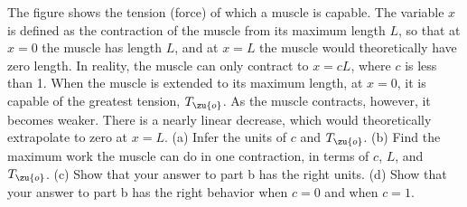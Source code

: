 The figure shows the tension (force) of which a muscle is capable.
The variable $x$ is defined as the contraction of the muscle from its maximum length $L$, so that at
$x=0$ the muscle has length $L$, and at $x=L$ the muscle would theoretically have zero length.
In reality, the muscle can only contract to $x=cL$, where $c$ is less than 1.
When the muscle is extended to its maximum length, at $x=0$, it is capable of the greatest tension, $T_\zu{o}$.
As the muscle contracts, however, it becomes weaker. There is a nearly linear
decrease, which would theoretically extrapolate to zero at $x=L$.
(a)  Infer the units of $c$ and $T_\zu{o}$.
(b) Find the maximum work the muscle can do in one contraction, in terms of $c$, $L$, and $T_\zu{o}$.
(c) Show that your answer to part b has the right units.
(d) Show that your answer to part b has the right behavior when $c=0$ and when $c=1$.\answercheck
